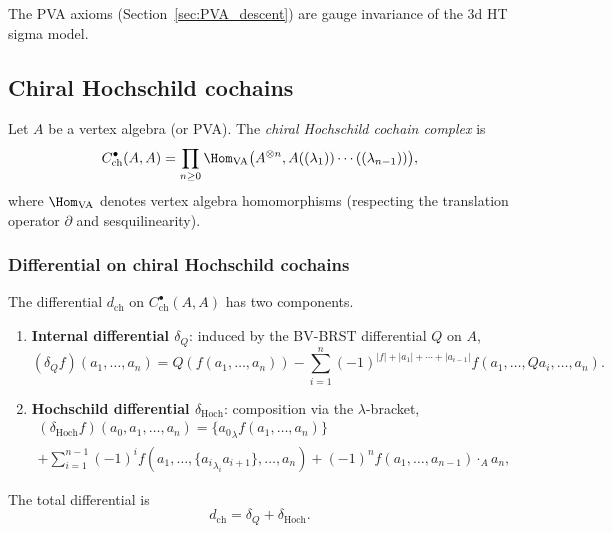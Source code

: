 The PVA axioms (Section~\ref{sec:PVA_descent}) are gauge invariance of the 3d HT sigma model.

\subsection{Chiral Hochschild cochains}

\begin{definition}
\label{def:chiral_hochschild}
Let $A$ be a vertex algebra (or PVA). The \emph{chiral Hochschild cochain complex} is
\begin{equation}
C^\bullet_{\text{ch}}(A, A) = \prod_{n \geq 0} \Hom_{\text{VA}}\big(A^{\otimes n}, A((\lambda_1)) \cdots ((\lambda_{n-1}))\big),
\end{equation}
where $\Hom_{\text{VA}}$ denotes vertex algebra homomorphisms (respecting the translation operator $\partial$ and sesquilinearity).
\end{definition}

\subsubsection{Differential on chiral Hochschild cochains}

The differential $d_{\text{ch}}$ on $C^\bullet_{\text{ch}}(A, A)$ has two components.

\begin{enumerate}[label=(\roman*)]
\item \textbf{Internal differential $\delta_Q$}: induced by the BV-BRST differential $Q$ on $A$,
\begin{equation}
(\delta_Q f)(a_1, \ldots, a_n) = Q(f(a_1, \ldots, a_n)) - \sum_{i=1}^n (-1)^{|f| + |a_1| + \cdots + |a_{i-1}|} f(a_1, \ldots, Qa_i, \ldots, a_n).
\end{equation}

\item \textbf{Hochschild differential $\delta_{\text{Hoch}}$}: composition via the $\lambda$-bracket,
\begin{multline}
(\delta_{\text{Hoch}} f)(a_0, a_1, \ldots, a_n) = \{{a_0}_\lambda f(a_1, \ldots, a_n)\} \\
+ \sum_{i=1}^{n-1} (-1)^i f(a_1, \ldots, \{{a_i}_{\lambda_i} a_{i+1}\}, \ldots, a_n) + (-1)^n f(a_1, \ldots, a_{n-1}) \cdot_{\!A} a_n,
\end{multline}
\end{enumerate}

The total differential is
\begin{equation}
d_{\text{ch}} = \delta_Q + \delta_{\text{Hoch}}.
\end{equation}

